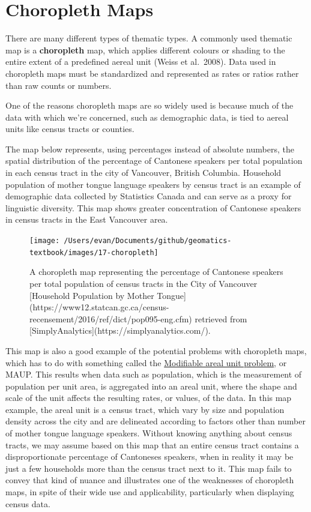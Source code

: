 \documentclass[
]{book}
\begin{document}
\hypertarget{choropleth-maps}{%
\section{Choropleth Maps}\label{choropleth-maps}}

There are many different types of thematic types. A commonly used thematic map is a \textbf{choropleth} map, which applies different colours or shading to the entire extent of a predefined aereal unit (Weiss et al.~2008). Data used in choropleth maps must be standardized and represented as rates or ratios rather than raw counts or numbers.

One of the reasons choropleth maps are so widely used is because much of the data with which we're concerned, such as demographic data, is tied to aereal units like census tracts or counties.

The map below represents, using percentages instead of absolute numbers, the spatial distribution of the percentage of Cantonese speakers per total population in each census tract in the city of Vancouver, British Columbia. Household population of mother tongue language speakers by census tract is an example of demographic data collected by Statistics Canada and can serve as a proxy for linguistic diversity. This map shows greater concentration of Cantonese speakers in census tracts in the East Vancouver area.

\begin{figure}
\texttt{[image: /Users/evan/Documents/github/geomatics-textbook/images/17-choropleth]} \caption{A choropleth map representing the 
percentage of Cantonese speakers per total population of census tracts in the City of Vancouver [Household Population by Mother Tongue](https://www12.statcan.gc.ca/census-recensement/2016/ref/dict/pop095-eng.cfm) retrieved from [SimplyAnalytics](https://simplyanalytics.com/).}\label{fig:17-choropleth}
\end{figure}

This map is also a good example of the potential problems with choropleth maps, which has to do with something called the \href{https://en.wikipedia.org/wiki/Modifiable_areal_unit_problem}{Modifiable areal unit problem}, or MAUP. This results when data such as population, which is the measurement of population per unit area, is aggregated into an areal unit, where the shape and scale of the unit affects the resulting rates, or values, of the data. In this map example, the areal unit is a census tract, which vary by size and population density across the city and are delineated according to factors other than number of mother tongue language speakers. Without knowing anything about census tracts, we may assume based on this map that an entire census tract contains a disproportionate percentage of Cantoneses speakers, when in reality it may be just a few households more than the census tract next to it. This map fails to convey that kind of nuance and illustrates one of the weaknesses of choropleth maps, in spite of their wide use and applicability, particularly when displaying census data.
\end{document}

